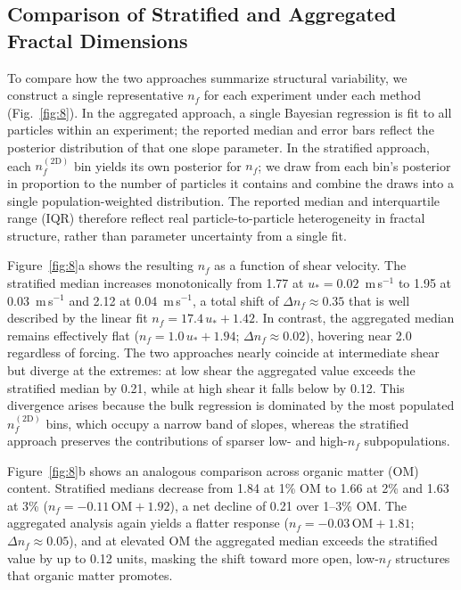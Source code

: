 \subsection{Comparison of Stratified and Aggregated Fractal Dimensions}

To compare how the two approaches summarize structural variability, we construct a single representative $n_f$ for each experiment under each method (Fig.~\ref{fig:8}). In the aggregated approach, a single Bayesian regression is fit to all particles within an experiment; the reported median and error bars reflect the posterior distribution of that one slope parameter. In the stratified approach, each $n_f^{(2\mathrm{D})}$ bin yields its own posterior for $n_f$; we draw from each bin's posterior in proportion to the number of particles it contains and combine the draws into a single population-weighted distribution. The reported median and interquartile range (IQR) therefore reflect real particle-to-particle heterogeneity in fractal structure, rather than parameter uncertainty from a single fit.

Figure~\ref{fig:8}a shows the resulting $n_f$ as a function of shear velocity. The stratified median increases monotonically from 1.77 at $u_* = 0.02$~m\,s$^{-1}$ to 1.95 at 0.03~m\,s$^{-1}$ and 2.12 at 0.04~m\,s$^{-1}$, a total shift of $\Delta n_f \approx 0.35$ that is well described by the linear fit $n_f = 17.4\,u_* + 1.42$. In contrast, the aggregated median remains effectively flat ($n_f = 1.0\,u_* + 1.94$; $\Delta n_f \approx 0.02$), hovering near 2.0 regardless of forcing. The two approaches nearly coincide at intermediate shear but diverge at the extremes: at low shear the aggregated value exceeds the stratified median by 0.21, while at high shear it falls below by 0.12. This divergence arises because the bulk regression is dominated by the most populated $n_f^{(2\mathrm{D})}$ bins, which occupy a narrow band of slopes, whereas the stratified approach preserves the contributions of sparser low- and high-$n_f$ subpopulations.

Figure~\ref{fig:8}b shows an analogous comparison across organic matter (OM) content. Stratified medians decrease from 1.84 at 1\% OM to 1.66 at 2\% and 1.63 at 3\% ($n_f = -0.11\,\mathrm{OM} + 1.92$), a net decline of 0.21 over 1--3\% OM. The aggregated analysis again yields a flatter response ($n_f = -0.03\,\mathrm{OM} + 1.81$; $\Delta n_f \approx 0.05$), and at elevated OM the aggregated median exceeds the stratified value by up to 0.12 units, masking the shift toward more open, low-$n_f$ structures that organic matter promotes.

